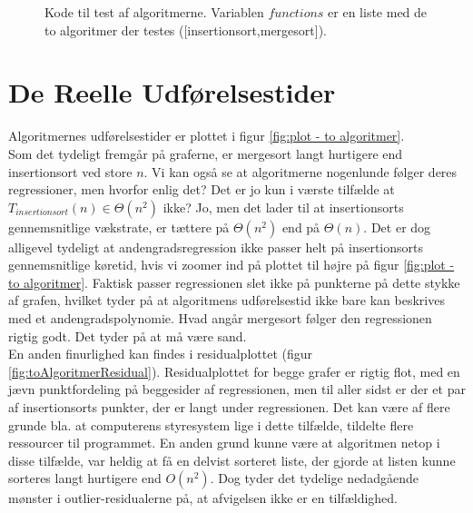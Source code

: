 \begin{figure}
	\begin{center}
		
	\end{center}
	\caption{Kode til test af algoritmerne. Variablen $functions$ er en liste med de to algoritmer der testes ([insertionsort,mergesort]).}
	\label{fig:Kode til test af algoritmerne}
\end{figure}



\section{De Reelle Udførelsestider}
\label{sec:De Reelle Køretider}

Algoritmernes udførelsestider er plottet i figur \ref{fig:plot - to algoritmer}.\\

Som det tydeligt fremgår på graferne, er mergesort langt hurtigere end insertionsort ved store $n$. Vi kan også se at algoritmerne nogenlunde følger deres regressioner, men hvorfor enlig det? Det er jo kun i værste tilfælde at $T_{insertionsort}(n) \in \Theta (n^2)$ ikke? Jo, men det lader til at insertionsorts gennemsnitlige vækstrate, er tættere på $\Theta (n^2)$ end på $\Theta (n)$. Det er dog alligevel tydeligt at andengradsregression ikke passer helt på insertionsorts gennemsnitlige køretid, hvis vi zoomer ind på plottet til højre på figur \ref{fig:plot - to algoritmer}. Faktisk passer regressionen slet ikke på punkterne på dette stykke af grafen, hvilket tyder på at algoritmens udførelsestid ikke bare kan beskrives med et andengradspolynomie. Hvad angår mergesort følger den regressionen rigtig godt. Det tyder på at  må være sand.\\

En anden finurlighed kan findes i residualplottet (figur \ref{fig:toAlgoritmerResidual}). Residualplottet for begge grafer er rigtig flot, med en jævn punktfordeling på beggesider af regressionen, men til aller sidst er der et par af insertionsorts punkter, der er langt under regressionen. Det kan være af flere grunde bla. at computerens styresystem lige i dette tilfælde, tildelte flere ressourcer til programmet. En anden grund kunne være at algoritmen netop i disse tilfælde, var heldig at få en delvist sorteret liste, der gjorde at listen kunne sorteres langt hurtigere end $O(n^2)$. Dog tyder det tydelige nedadgående mønster i outlier-residualerne på, at afvigelsen ikke er en tilfældighed.\\

